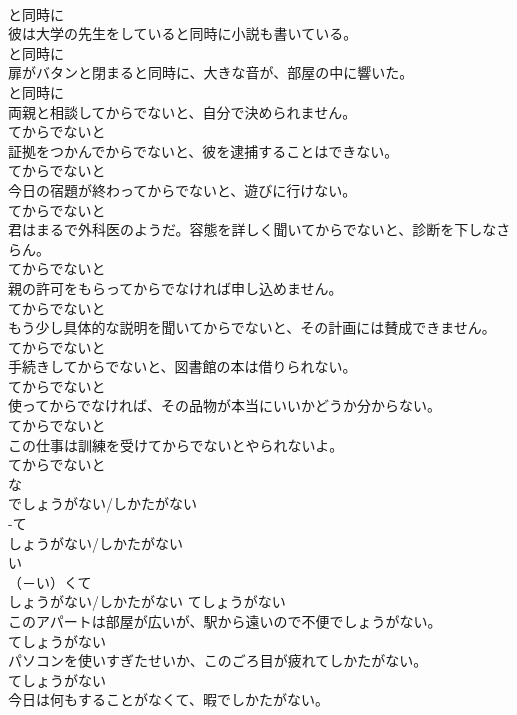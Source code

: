 \documentclass[8pt]{extreport}
\begin{document}
\begin{CJK}{UTF8}{min}
\\	と同時に	
\\	彼は大学の先生をしていると同時に小説も書いている。	
\\	と同時に	
\\	扉がバタンと閉まると同時に、大きな音が、部屋の中に響いた。	
\\	と同時に	
\\	両親と相談してからでないと、自分で決められません。	
\\	てからでないと	
\\	証拠をつかんでからでないと、彼を逮捕することはできない。	
\\	てからでないと	
\\	今日の宿題が終わってからでないと、遊びに行けない。	
\\	てからでないと	
\\	君はまるで外科医のようだ。容態を詳しく聞いてからでないと、診断を下しなさらん。	
\\	てからでないと	
\\	親の許可をもらってからでなければ申し込めません。	
\\	てからでないと	
\\	もう少し具体的な説明を聞いてからでないと、その計画には賛成できません。	
\\	てからでないと	
\\	手続きしてからでないと、図書館の本は借りられない。	
\\	てからでないと	
\\	使ってからでなければ、その品物が本当にいいかどうか分からない。	
\\	てからでないと	
\\	この仕事は訓練を受けてからでないとやられないよ。	
\\	てからでないと	
\\	な
\\	でしょうがない/しかたがない	
\\	-て
\\	しょうがない/しかたがない	
\\	い
\\	（－い）くて 
\\	しょうがない/しかたがない	てしょうがない	
\\	このアパートは部屋が広いが、駅から遠いので不便でしょうがない。	
\\	てしょうがない	
\\	パソコンを使いすぎたせいか、このごろ目が疲れてしかたがない。	
\\	てしょうがない	
\\	今日は何もすることがなくて、暇でしかたがない。	

\end{CJK}
\end{document}
